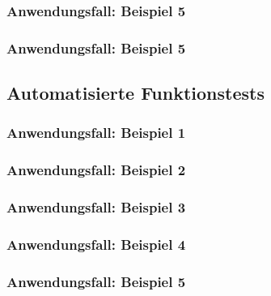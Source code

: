 \documentclass[enabledeprecatedfontcommands,fontsize=12pt,paper=a4,twoside]{scrartcl}
\begin{document}
\subsubsection{Anwendungsfall: Beispiel 5}


\subsubsection{Anwendungsfall: Beispiel 5}


\subsection{Automatisierte Funktionstests}

\subsubsection{Anwendungsfall: Beispiel 1}


\subsubsection{Anwendungsfall: Beispiel 2}


\subsubsection{Anwendungsfall: Beispiel 3}


\subsubsection{Anwendungsfall: Beispiel 4}


\subsubsection{Anwendungsfall: Beispiel 5}

\end{document}
